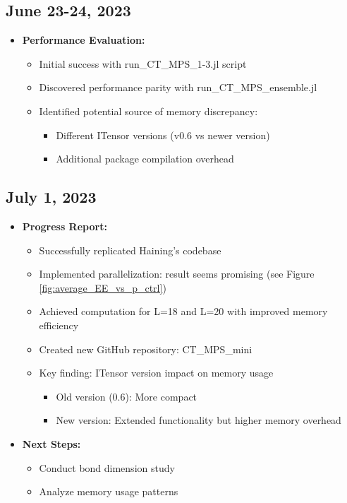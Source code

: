 \documentclass[11pt,a4paper]{article}
\begin{document}
\subsection{June 23-24, 2023}
\begin{itemize}
    \item \textbf{Performance Evaluation:}
    \begin{itemize}
        \item Initial success with run\_CT\_MPS\_1-3.jl script
        \item Discovered performance parity with run\_CT\_MPS\_ensemble.jl
        \item Identified potential source of memory discrepancy:
            \begin{itemize}
                \item Different ITensor versions (v0.6 vs newer version)
                \item Additional package compilation overhead
            \end{itemize}
    \end{itemize}
\end{itemize}

\subsection{July 1, 2023}
\begin{itemize}
    \item \textbf{Progress Report:}
    \begin{itemize}
        \item Successfully replicated Haining's codebase
        \item Implemented parallelization: result seems promising (see Figure \ref{fig:average_EE_vs_p_ctrl})
        \item Achieved computation for L=18 and L=20 with improved memory efficiency
        \item Created new GitHub repository: CT\_MPS\_mini
        \item Key finding: ITensor version impact on memory usage
            \begin{itemize}
                \item Old version (0.6): More compact
                \item New version: Extended functionality but higher memory overhead
            \end{itemize}
    \end{itemize}
    \item \textbf{Next Steps:}
    \begin{itemize}
        \item Conduct bond dimension study
        \item Analyze memory usage patterns
    \end{itemize}
\end{itemize}
\end{document}
